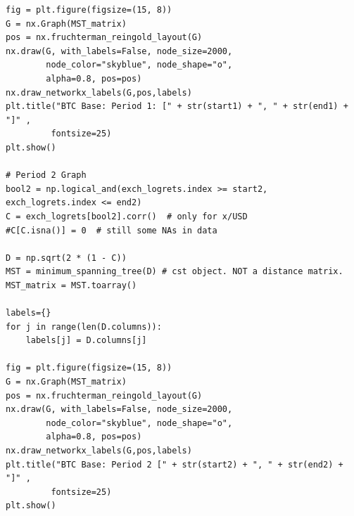 \documentclass[a4paper]{article}
\begin{document}
\begin{lstlisting}
fig = plt.figure(figsize=(15, 8))
G = nx.Graph(MST_matrix)
pos = nx.fruchterman_reingold_layout(G)
nx.draw(G, with_labels=False, node_size=2000, 
        node_color="skyblue", node_shape="o", 
        alpha=0.8, pos=pos)
nx.draw_networkx_labels(G,pos,labels)
plt.title("BTC Base: Period 1: [" + str(start1) + ", " + str(end1) + "]" ,
         fontsize=25)
plt.show()

# Period 2 Graph
bool2 = np.logical_and(exch_logrets.index >= start2, exch_logrets.index <= end2)
C = exch_logrets[bool2].corr()  # only for x/USD
#C[C.isna()] = 0  # still some NAs in data

D = np.sqrt(2 * (1 - C))
MST = minimum_spanning_tree(D) # cst object. NOT a distance matrix.
MST_matrix = MST.toarray()

labels={}
for j in range(len(D.columns)):
    labels[j] = D.columns[j]
    
fig = plt.figure(figsize=(15, 8))
G = nx.Graph(MST_matrix)
pos = nx.fruchterman_reingold_layout(G)
nx.draw(G, with_labels=False, node_size=2000, 
        node_color="skyblue", node_shape="o", 
        alpha=0.8, pos=pos)
nx.draw_networkx_labels(G,pos,labels)
plt.title("BTC Base: Period 2 [" + str(start2) + ", " + str(end2) + "]" ,
         fontsize=25)
plt.show()
\end{lstlisting}
\end{document}
